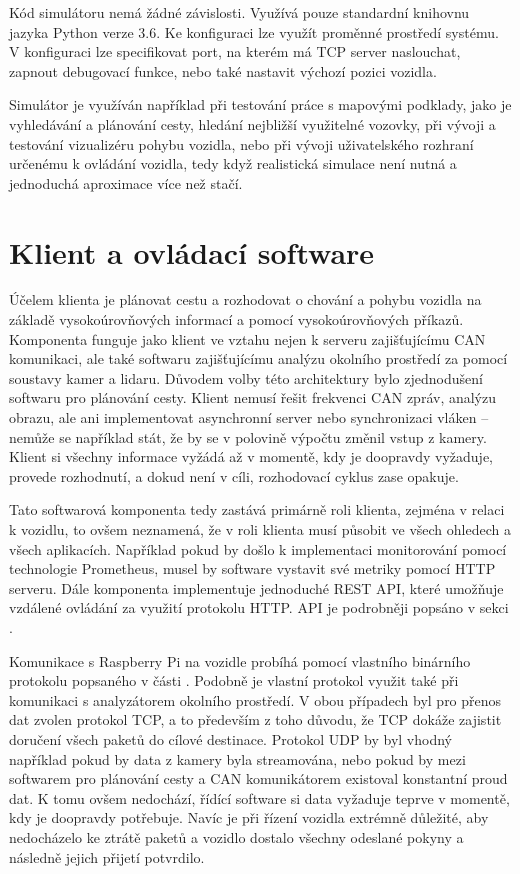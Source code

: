 \documentclass[czech, bachelor]{diploma}
\begin{document}
Kód simulátoru nemá žádné závislosti. Využívá pouze standardní knihovnu jazyka Python verze 3.6. Ke konfiguraci lze využít
proměnné prostředí systému. V konfiguraci lze specifikovat port, na kterém má TCP server naslouchat, zapnout debugovací funkce,
nebo také nastavit výchozí pozici vozidla.

Simulátor je využíván například při testování práce s mapovými podklady, jako je vyhledávání a plánování cesty, hledání nejbližší
využitelné vozovky, při vývoji a testování vizualizéru pohybu vozidla, nebo při vývoji uživatelského rozhraní určenému k ovládání
vozidla, tedy když realistická simulace není nutná a jednoduchá aproximace více než stačí.

\chapter{Klient a ovládací software}

Účelem klienta je plánovat cestu a rozhodovat o chování a pohybu vozidla na základě vysokoúrovňových informací a pomocí
vysokoúrovňových příkazů. Komponenta funguje jako klient ve vztahu nejen k serveru zajišťujícímu CAN komunikaci, ale také
softwaru zajišťujícímu analýzu okolního prostředí za pomocí soustavy kamer a lidaru. Důvodem volby této architektury bylo
zjednodušení softwaru pro plánování cesty. Klient nemusí řešit frekvenci CAN zpráv, analýzu obrazu, ale ani implementovat
asynchronní server nebo synchronizaci vláken -- nemůže se například stát, že by se v polovině výpočtu změnil vstup z kamery.
Klient si všechny informace vyžádá až v momentě, kdy je doopravdy vyžaduje, provede rozhodnutí, a dokud není v cíli, rozhodovací
cyklus zase opakuje.

Tato softwarová komponenta tedy zastává primárně roli klienta, zejména v relaci k vozidlu, to ovšem neznamená, že v roli klienta
musí působit ve všech ohledech a všech aplikacích. Například pokud by došlo k implementaci monitorování pomocí technologie
Prometheus, musel by software vystavit své metriky pomocí HTTP serveru. Dále komponenta implementuje jednoduché REST API, které
umožňuje vzdálené ovládání za využití protokolu HTTP. API je podrobněji popsáno v sekci .

Komunikace s Raspberry Pi na vozidle probíhá pomocí vlastního binárního protokolu popsaného v části .
Podobně je vlastní protokol využit také při komunikaci s analyzátorem okolního prostředí. V obou případech byl pro přenos dat
zvolen protokol TCP, a to především z toho důvodu, že TCP dokáže zajistit doručení všech paketů do cílové destinace. Protokol UDP
by byl vhodný například pokud by data z kamery byla streamována, nebo pokud by mezi softwarem pro plánování cesty a CAN
komunikátorem existoval konstantní proud dat. K tomu ovšem nedochází, řídící software si data vyžaduje teprve v momentě, kdy je
doopravdy potřebuje. Navíc je při řízení vozidla extrémně důležité, aby nedocházelo ke ztrátě paketů a vozidlo dostalo všechny
odeslané pokyny a následně jejich přijetí potvrdilo.
\end{document}

